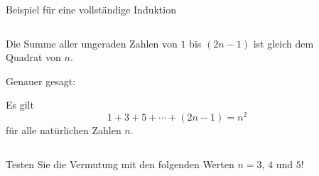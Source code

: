 \documentclass[12pt,ngerman,a4paper,ignorenonframetext,]{beamer}
\begin{document}
\begin{frame}{Beispiel für eine vollständige Induktion}
\protect\hypertarget{beispiel-fur-eine-vollstandige-induktion}{}


\begin{columns}[T]
	\begin{column}[t]{0.74\textwidth}


\begin{Satz}

Die Summe aller ungeraden Zahlen von \(1\) bis \((2n-1)\) ist gleich dem
Quadrat von \(n\).

Genauer gesagt:

Es gilt \[ 1 + 3 + 5 + \cdots + (2n-1) = n^2 \] für alle natürlichen
Zahlen \(n\).

\end{Satz}


	\end{column}
	\begin{column}[t]{0.24\textwidth}
	\end{column}
\end{columns}


\begin{Uebung}[]

Testen Sie die Vermutung mit den folgenden Werten \(n=3\), \(4\) und
\(5\)!

\end{Uebung}

\end{frame}
\end{document}
